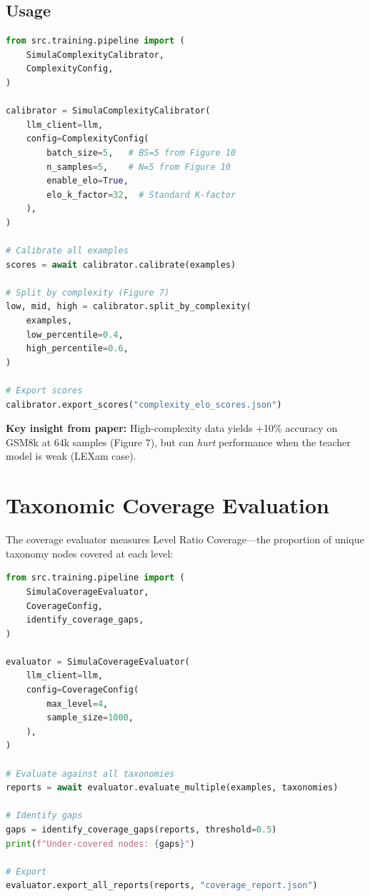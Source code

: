 \subsection{Usage}

\begin{lstlisting}[language=Python,caption={Complexity calibrator usage}]
from src.training.pipeline import (
    SimulaComplexityCalibrator,
    ComplexityConfig,
)

calibrator = SimulaComplexityCalibrator(
    llm_client=llm,
    config=ComplexityConfig(
        batch_size=5,   # BS=5 from Figure 10
        n_samples=5,    # N=5 from Figure 10
        enable_elo=True,
        elo_k_factor=32,  # Standard K-factor
    ),
)

# Calibrate all examples
scores = await calibrator.calibrate(examples)

# Split by complexity (Figure 7)
low, mid, high = calibrator.split_by_complexity(
    examples,
    low_percentile=0.4,
    high_percentile=0.6,
)

# Export scores
calibrator.export_scores("complexity_elo_scores.json")
\end{lstlisting}

\textbf{Key insight from paper:} High-complexity data yields +10\% accuracy on GSM8k
at 64k samples (Figure 7), but can \emph{hurt} performance when the teacher model
is weak (LEXam case).

\section{Taxonomic Coverage Evaluation}

The coverage evaluator measures Level Ratio Coverage---the proportion of unique
taxonomy nodes covered at each level:

\begin{lstlisting}[language=Python,caption={Coverage evaluator usage}]
from src.training.pipeline import (
    SimulaCoverageEvaluator,
    CoverageConfig,
    identify_coverage_gaps,
)

evaluator = SimulaCoverageEvaluator(
    llm_client=llm,
    config=CoverageConfig(
        max_level=4,
        sample_size=1000,
    ),
)

# Evaluate against all taxonomies
reports = await evaluator.evaluate_multiple(examples, taxonomies)

# Identify gaps
gaps = identify_coverage_gaps(reports, threshold=0.5)
print(f"Under-covered nodes: {gaps}")

# Export
evaluator.export_all_reports(reports, "coverage_report.json")
\end{lstlisting}

